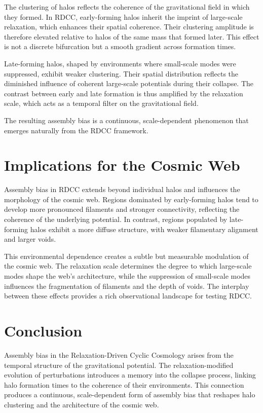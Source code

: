 \documentclass[11pt,a4paper]{article}
\begin{document}
The clustering of halos reflects the coherence of the gravitational field in which 
they formed. In RDCC, early-forming halos inherit the imprint of large-scale 
relaxation, which enhances their spatial coherence. Their clustering amplitude is 
therefore elevated relative to halos of the same mass that formed later. This effect 
is not a discrete bifurcation but a smooth gradient across formation times.

Late-forming halos, shaped by environments where small-scale modes were suppressed, 
exhibit weaker clustering. Their spatial distribution reflects the diminished 
influence of coherent large-scale potentials during their collapse. The contrast 
between early and late formation is thus amplified by the relaxation scale, which 
acts as a temporal filter on the gravitational field.

The resulting assembly bias is a continuous, scale-dependent phenomenon that emerges 
naturally from the RDCC framework.
\section{Implications for the Cosmic Web}

Assembly bias in RDCC extends beyond individual halos and influences the morphology 
of the cosmic web. Regions dominated by early-forming halos tend to develop more 
pronounced filaments and stronger connectivity, reflecting the coherence of the 
underlying potential. In contrast, regions populated by late-forming halos exhibit 
a more diffuse structure, with weaker filamentary alignment and larger voids.

This environmental dependence creates a subtle but measurable modulation of the 
cosmic web. The relaxation scale determines the degree to which large-scale modes 
shape the web's architecture, while the suppression of small-scale modes influences 
the fragmentation of filaments and the depth of voids. The interplay between these 
effects provides a rich observational landscape for testing RDCC.
\section{Conclusion}

Assembly bias in the Relaxation-Driven Cyclic Cosmology arises from the temporal 
structure of the gravitational potential. The relaxation-modified evolution of 
perturbations introduces a memory into the collapse process, linking halo formation 
times to the coherence of their environments. This connection produces a continuous, 
scale-dependent form of assembly bias that reshapes halo clustering and the 
architecture of the cosmic web.
\end{document}
